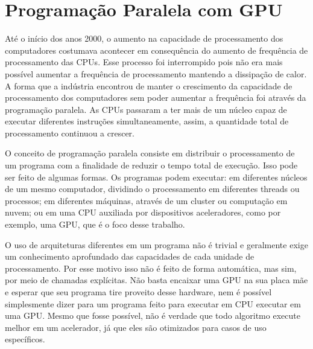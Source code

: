 \chapter{Programação Paralela com GPU}\label{chp:LABEL_CHP_3}

Até o início dos anos 2000, o aumento na capacidade de processamento dos computadores costumava acontecer em consequência do aumento de frequência de processamento das CPUs. Esse processo foi interrompido pois não era mais possível aumentar a frequência de processamento mantendo a dissipação de calor. A forma que a indústria encontrou de manter o crescimento da capacidade de processamento dos computadores sem poder aumentar a frequência foi através da programação paralela. As CPUs passaram a ter mais de um núcleo capaz de executar diferentes instruções simultaneamente, assim, a quantidade total de processamento continuou a crescer.

O conceito de programação paralela consiste em distribuir o processamento de um programa com a finalidade de reduzir o tempo total de execução. Isso pode ser feito de algumas formas. Os programas podem executar: em diferentes núcleos de um mesmo computador, dividindo o processamento em diferentes threads ou processos; em diferentes máquinas, através de um cluster ou computação em nuvem; ou em uma CPU auxiliada por dispositivos aceleradores, como por exemplo, uma GPU, que é o foco desse trabalho.

O uso de arquiteturas diferentes em um programa não é trivial e geralmente exige um conhecimento aprofundado das capacidades de cada unidade de processamento. Por esse motivo isso não é feito de forma automática, mas sim, por meio de chamadas explícitas. Não basta encaixar uma GPU na sua placa mãe e esperar que seu programa tire proveito desse hardware, nem é possível simplesmente dizer para um programa feito para executar em CPU executar em uma GPU.
Mesmo que fosse possível, não é verdade que todo algoritmo execute melhor em um acelerador, já que eles são otimizados para casos de uso específicos.

